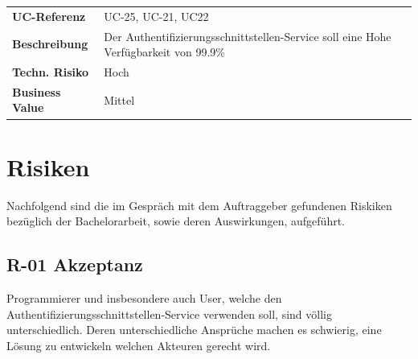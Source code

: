 \begin{longtable}[c]{@{}ll@{}}
\toprule
\begin{minipage}[t]{0.20\columnwidth}\raggedright\strut
\textbf{UC-Referenz}
\strut\end{minipage} &
\begin{minipage}[t]{0.74\columnwidth}\raggedright\strut
UC-25, UC-21, UC22
\strut\end{minipage}\tabularnewline
\begin{minipage}[t]{0.20\columnwidth}\raggedright\strut
\textbf{Beschreibung}
\strut\end{minipage} &
\begin{minipage}[t]{0.74\columnwidth}\raggedright\strut
Der Authentifizierungsschnittstellen-Service soll eine Hohe
Verfügbarkeit von 99.9\%
\strut\end{minipage}\tabularnewline
\begin{minipage}[t]{0.20\columnwidth}\raggedright\strut
\textbf{Techn. Risiko}
\strut\end{minipage} &
\begin{minipage}[t]{0.74\columnwidth}\raggedright\strut
Hoch
\strut\end{minipage}\tabularnewline
\begin{minipage}[t]{0.20\columnwidth}\raggedright\strut
\textbf{Business Value}
\strut\end{minipage} &
\begin{minipage}[t]{0.74\columnwidth}\raggedright\strut
Mittel
\strut\end{minipage}\tabularnewline
\bottomrule
\end{longtable}

\newpage

\newpage

\section{Risiken}\label{risiken}

Nachfolgend sind die im Gespräch mit dem Auftraggeber gefundenen
Riskiken bezüglich der Bachelorarbeit, sowie deren Auswirkungen,
aufgeführt.

\subsection{R-01 Akzeptanz}\label{r-01-akzeptanz}

Programmierer und insbesondere auch User, welche den
Authentifizierungsschnittstellen-Service verwenden soll, sind völlig
unterschiedlich. Deren unterschiedliche Ansprüche machen es schwierig,
eine Lösung zu entwickeln welchen Akteuren gerecht wird.

